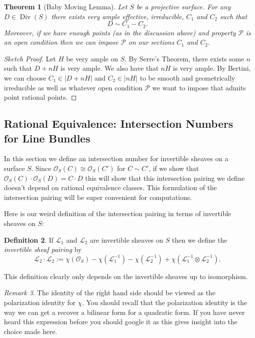 \documentclass[12pt]{article}
\numberwithin{equation}{section}
\newtheorem{theorem}{Theorem}[subsection]
\theoremstyle{definition}
\newtheorem{definition}[theorem]{Definition}
\theoremstyle{remark}
\newtheorem{remark}[theorem]{Remark}
\newcommand{\Ocal}{\mathcal{O}}
\newcommand{\Div}{\operatorname{Div}}
\newcommand{\Lcal}{\mathcal{L}}
\newcommand{\Pcal}{\mathcal{P}}
\begin{document}
\begin{theorem}[Baby Moving Lemma]
	Let $S$ be a projective surface.
	For any $D\in \Div(S)$ there exists very ample effective, irreducible, $C_1$ and $C_2$ such that 
	 $$ D \sim C_1 - C_2. $$
	Moreover, if we have enough points (as in the discussion above) and property $\Pcal$ is an open condition then we can impose $\Pcal$ on our sections $C_1$ and $C_2$.
\end{theorem}
\begin{proof}[Sketch Proof]
	Let $H$ be very ample on $S$. 
	By Serre's Theorem, there exists some $n$ such that $D+nH$ is very ample. 
	We also have that $nH$ is very ample. 
	By Bertini, we can choose $C_1 \in \vert D+n H\vert$ and $C_2 \in \vert n H \vert$ to be smooth and geometrically irreducible as well as whatever open condition $\Pcal$ we want to impose that admits point rational points.
\end{proof}

\subsection{Rational Equivalence: Intersection Numbers for Line Bundles}
In this section we define an intersection number for invertible sheaves on a surface $S$. 
Since $\Ocal_S(C)\cong \Ocal_S(C')$ for $C\sim C'$, if we show that $\Ocal_S(C)\cdot \Ocal_S(D) = C\cdot D$ this will show that this intersection pairing we define doesn't depend on rational equivalence classes. 
This formulation of the intersection pairing will be super convenient for computations. 

Here is our weird definition of the intersection pairing in terms of invertible sheaves on $S$:
\begin{definition}
If $\Lcal_1$ and $\Lcal_2$ are invertible sheaves on $S$ then we define the \emph{invertible sheaf pairing} by 
 $$ \Lcal_2 \cdot \Lcal_2 := \chi(\Ocal_S) - \chi(\Lcal_1^{-1}) - \chi(\Lcal_2^{-1}) +\chi(\Lcal_1^{-1}\otimes \Lcal_2^{-1}). $$
\end{definition}
This definition clearly only depends on the invertible sheaves up to isomorphism.
\begin{remark}
	The identity of the right hand side should be viewed as the polarization identity for $\chi$. 
	You should recall that the polarization identity is the way we can get a recover a bilinear form for a quadratic form. 
	If you have never heard this expression before you should google it as this gives insight into the choice made here.
\end{remark}
\end{document}
